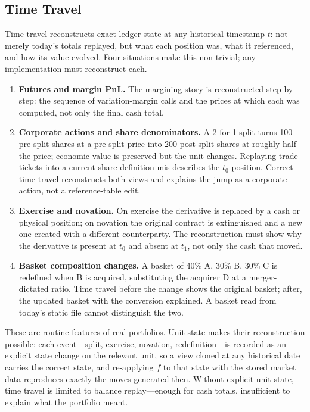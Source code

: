 \subsection{Time Travel}

Time travel reconstructs exact ledger state at any historical timestamp $t$: not merely today's totals replayed, but what each position was, what it referenced, and how its value evolved. Four situations make this non-trivial; any implementation must reconstruct each.

\begin{enumerate}
\item \textbf{Futures and margin PnL.} The margining story is reconstructed step by step: the sequence of variation-margin calls and the prices at which each was computed, not only the final cash total.
\item \textbf{Corporate actions and share denominators.} A 2-for-1 split turns 100 pre-split shares at a pre-split price into 200 post-split shares at roughly half the price; economic value is preserved but the unit changes. Replaying trade tickets into a current share definition mis-describes the $t_0$ position. Correct time travel reconstructs both views and explains the jump as a corporate action, not a reference-table edit.
\item \textbf{Exercise and novation.} On exercise the derivative is replaced by a cash or physical position; on novation the original contract is extinguished and a new one created with a different counterparty. The reconstruction must show why the derivative is present at $t_0$ and absent at $t_1$, not only the cash that moved.
\item \textbf{Basket composition changes.} A basket of 40\% A, 30\% B, 30\% C is redefined when B is acquired, substituting the acquirer D at a merger-dictated ratio. Time travel before the change shows the original basket; after, the updated basket with the conversion explained. A basket read from today's static file cannot distinguish the two.
\end{enumerate}

These are routine features of real portfolios. Unit state makes their reconstruction possible: each event---split, exercise, novation, redefinition---is recorded as an explicit state change on the relevant unit, so a view cloned at any historical date carries the correct state, and re-applying $f$ to that state with the stored market data reproduces exactly the moves generated then. Without explicit unit state, time travel is limited to balance replay---enough for cash totals, insufficient to explain what the portfolio meant.

